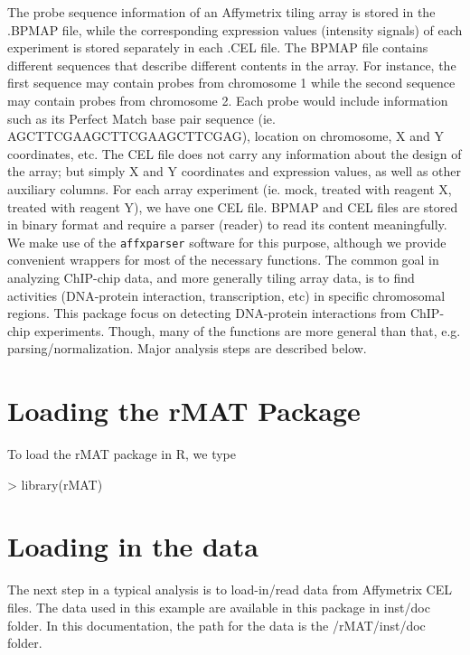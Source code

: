 \documentclass[11pt]{article}
\begin{document}
The probe sequence information of an Affymetrix tiling array is stored in the .BPMAP file, while the corresponding expression values (intensity signals) of each experiment is stored separately in each .CEL file. The BPMAP file contains different sequences that describe different contents in the array. For instance, the first sequence may contain probes from chromosome 1 while the second sequence may contain probes from chromosome 2. Each probe would include information such as its Perfect Match base pair sequence (ie. AGCTTCGAAGCTTCGAAGCTTCGAG), location on chromosome, X and Y coordinates, etc. The CEL file does not carry any information about the design of the array; but simply X and Y coordinates and expression values, as well as other auxiliary columns. For each array experiment (ie. mock, treated with reagent X, treated with reagent Y), we have one CEL file. BPMAP and CEL files are stored in binary format and require a parser (reader) to read its content meaningfully. We make use of the \texttt{affxparser} software for this purpose, although we provide convenient wrappers for most of the necessary functions.
\newline
The common goal in analyzing ChIP-chip data, and more generally tiling array data, is to find activities (DNA-protein interaction, transcription, etc) in specific chromosomal regions. This package focus on detecting DNA-protein interactions from ChIP-chip experiments. Though, many of the functions are more general than that, e.g. parsing/normalization. Major analysis steps are described below.

\part{Loading the rMAT Package}
To load the rMAT package in R, we type 


\begin{Schunk}
\begin{Sinput}
> library(rMAT)
\end{Sinput}
\end{Schunk}

\part{Loading in the data}
The next step in a typical analysis is to load-in/read data from Affymetrix CEL files. 
The data used in this example are available in this package in inst/doc folder. \newline 
In this documentation, the path for the data is the  /rMAT/inst/doc folder. 
\end{document}
